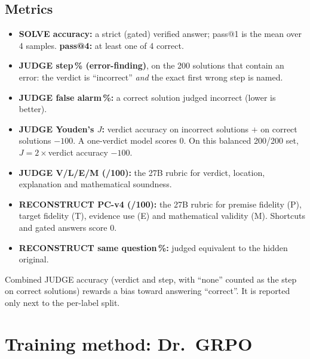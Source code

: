 \documentclass[10pt,a4paper]{article}
\begin{document}
\subsection{Metrics}
\begin{itemize}
\item \textbf{SOLVE accuracy:} a strict (gated) verified answer; pass@1 is the mean over 4 samples. \textbf{pass@4:}
      at least one of 4 correct.
\item \textbf{JUDGE step\,\% (error-finding)}, on the 200 solutions that contain an error: the verdict is
      ``incorrect'' \emph{and} the exact first wrong step is named.
\item \textbf{JUDGE false alarm\,\%:} a correct solution judged incorrect (lower is better).
\item \textbf{JUDGE Youden's $J$:} verdict accuracy on incorrect solutions $+$ on correct solutions $-100$. A
      one-verdict model scores 0. On this balanced 200/200 set, $J = 2\times$verdict accuracy $-100$.
\item \textbf{JUDGE V/L/E/M (/100):} the 27B rubric for verdict, location, explanation and mathematical soundness.
\item \textbf{RECONSTRUCT PC-v4 (/100):} the 27B rubric for premise fidelity (P), target fidelity (T), evidence use (E)
      and mathematical validity (M). Shortcuts and gated answers score 0.
\item \textbf{RECONSTRUCT same question\,\%:} judged equivalent to the hidden original.
\end{itemize}
Combined JUDGE accuracy (verdict and step, with ``none'' counted as the step on correct solutions) rewards a bias
toward answering ``correct''. It is reported only next to the per-label split.

\section{Training method: Dr.~GRPO}
\end{document}

